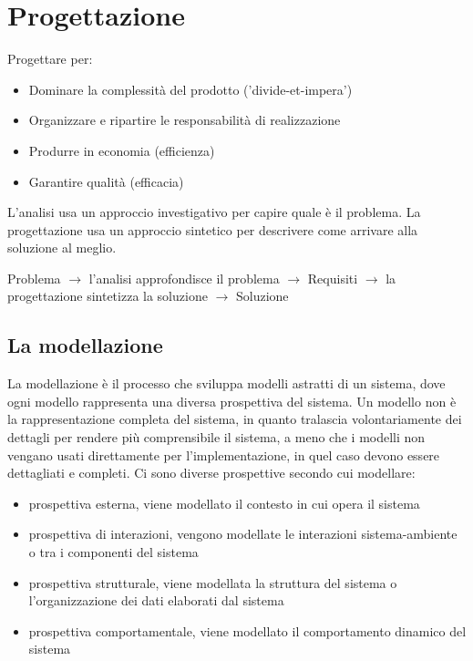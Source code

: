 \chapter{Progettazione}

Progettare per:
\begin{itemize}
\item Dominare la complessità del prodotto ('divide-et-impera')
\item Organizzare e ripartire le responsabilità di realizzazione
\item Produrre in economia (efficienza)
\item Garantire qualità (efficacia)
\end{itemize}


L'analisi usa un approccio investigativo per capire quale è il problema.
La progettazione usa un approccio sintetico per descrivere come arrivare alla soluzione al meglio.

Problema $\to$ l'analisi approfondisce il problema $\to$ Requisiti $\to$ la progettazione sintetizza la soluzione $\to$ Soluzione

\section{La modellazione}

La modellazione è il processo che sviluppa modelli astratti di un sistema, dove ogni modello rappresenta una diversa prospettiva del sistema.
Un modello non è la rappresentazione completa del sistema, in quanto tralascia volontariamente dei dettagli per rendere più comprensibile il sistema, a meno che i modelli non vengano usati direttamente per l'implementazione, in quel caso devono essere dettagliati e completi.
Ci sono diverse prospettive secondo cui modellare:
\begin{itemize}
\item prospettiva esterna, viene modellato il contesto in cui opera il sistema
\item prospettiva di interazioni, vengono modellate le interazioni sistema-ambiente o tra i componenti del sistema
\item prospettiva strutturale, viene modellata la struttura del sistema o l'organizzazione dei dati elaborati dal sistema
\item prospettiva comportamentale, viene modellato il comportamento dinamico del sistema
\end{itemize}








